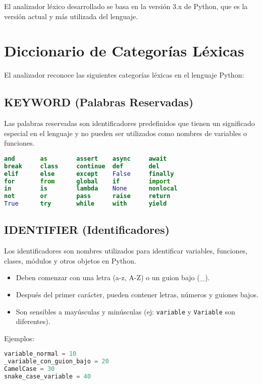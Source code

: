 \documentclass[12pt,letterpaper]{report}
\begin{document}
El analizador léxico desarrollado se basa en la versión 3.x de Python, que es la versión actual y más utilizada del lenguaje.

\chapter{Diccionario de Categorías Léxicas}

El analizador reconoce las siguientes categorías léxicas en el lenguaje Python:

\section{KEYWORD (Palabras Reservadas)}

Las palabras reservadas son identificadores predefinidos que tienen un significado especial en el lenguaje y no pueden ser utilizados como nombres de variables o funciones.

\begin{lstlisting}[language=Python]
and       as        assert    async     await
break     class     continue  def       del
elif      else      except    False     finally
for       from      global    if        import
in        is        lambda    None      nonlocal
not       or        pass      raise     return
True      try       while     with      yield
\end{lstlisting}

\section{IDENTIFIER (Identificadores)}

Los identificadores son nombres utilizados para identificar variables, funciones, clases, módulos y otros objetos en Python.

\begin{itemize}
    \item Deben comenzar con una letra (a-z, A-Z) o un guion bajo (\_).
    \item Después del primer carácter, pueden contener letras, números y guiones bajos.
    \item Son sensibles a mayúsculas y minúsculas (ej: \texttt{variable} y \texttt{Variable} son diferentes).
\end{itemize}

Ejemplos:
\begin{lstlisting}[language=Python]
variable_normal = 10
_variable_con_guion_bajo = 20
CamelCase = 30
snake_case_variable = 40
\end{lstlisting}
\end{document}
